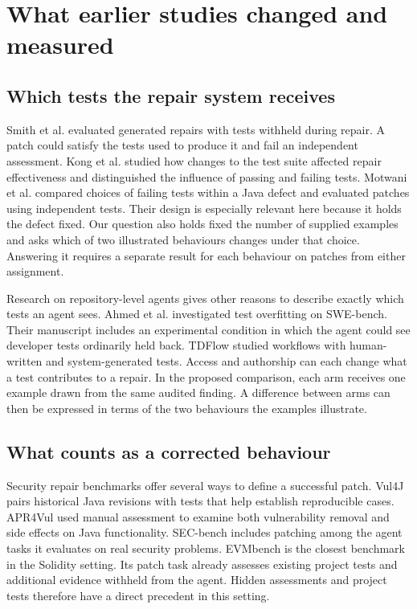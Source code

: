 \section{What earlier studies changed and measured}

\label{sec:related-work}

\subsection{Which tests the repair system receives}

Smith et al. evaluated generated repairs with tests withheld during repair. A patch could satisfy the tests used to produce it and fail an independent assessment. Kong et al. studied how changes to the test suite affected repair effectiveness and distinguished the influence of passing and failing tests. Motwani et al. compared choices of failing tests within a Java defect and evaluated patches using independent tests. Their design is especially relevant here because it holds the defect fixed. Our question also holds fixed the number of supplied examples and asks which of two illustrated behaviours changes under that choice. Answering it requires a separate result for each behaviour on patches from either assignment.~\cite{smith2015overfitting,kong2018impacts,motwani2022quality}

Research on repository-level agents gives other reasons to describe exactly which tests an agent sees. Ahmed et al. investigated test overfitting on SWE-bench. Their manuscript includes an experimental condition in which the agent could see developer tests ordinarily held back. TDFlow studied workflows with human-written and system-generated tests. Access and authorship can each change what a test contributes to a repair. In the proposed comparison, each arm receives one example drawn from the same audited finding. A difference between arms can then be expressed in terms of the two behaviours the examples illustrate.~\cite{ahmed2026overfitting,han2026tdflow}

\subsection{What counts as a corrected behaviour}

Security repair benchmarks offer several ways to define a successful patch. Vul4J pairs historical Java revisions with tests that help establish reproducible cases. APR4Vul used manual assessment to examine both vulnerability removal and side effects on Java functionality. SEC-bench includes patching among the agent tasks it evaluates on real security problems. EVMbench is the closest benchmark in the Solidity setting. Its patch task already assesses existing project tests and additional evidence withheld from the agent. Hidden assessments and project tests therefore have a direct precedent in this setting.~\cite{bui2022vul4j,bui2024apr4vul,lee2025secbench,wang2026evmbench}

